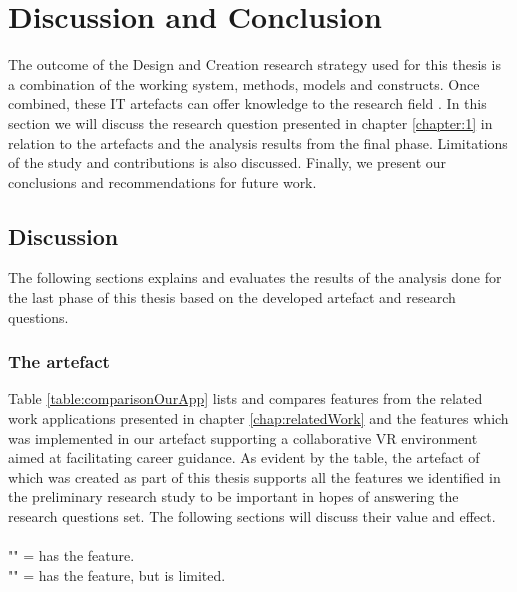 
\chapter{Discussion and Conclusion}
The outcome of the Design and Creation research strategy used for this thesis is a combination of the working system, methods, models and constructs. Once combined, these IT artefacts can offer knowledge to the research field \cite{oates2005researching}. In this section we will discuss the research question presented in chapter \ref{chapter:1} in relation to the artefacts and the analysis results from the final phase. Limitations of the study and contributions is also discussed.
Finally, we present our conclusions and recommendations for future work.



\section{Discussion}
The following sections explains and evaluates the results of the analysis done for the last phase of this thesis based on the developed artefact and research questions.

\subsection{The artefact} 
Table \ref{table:comparisonOurApp} lists and compares features from the related work applications presented in chapter \ref{chap:relatedWork} and the features which was implemented in our artefact supporting a collaborative VR environment aimed at facilitating career guidance. As evident by the table, the artefact of which was created as part of this thesis supports all the features we identified in the preliminary research study to be important in hopes of answering the research questions set. The following sections will discuss their value and effect.   
\\
\\ "\ON" = has the feature.
\\ "\LIM" = has the feature, but is limited.


